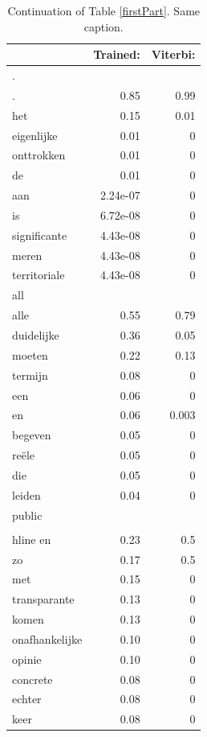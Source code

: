 \documentclass[11pt]{article}
\begin{document}
\begin{table}[h]
\begin{tabular}{l r r}
&Trained:	&Viterbi:\\\hline\hline
.&&\\\hline
.		&0.85		&0.99\\
het		&0.15		&0.01\\
eigenlijke	&0.01 	&0\\
onttrokken	&0.01		&0\\
de		&0.01		&0\\
aan		&2.24e-07	&0\\
is		&6.72e-08	&0\\
significante	&4.43e-08	&0\\
meren		&4.43e-08	&0\\
territoriale	&4.43e-08	&0\\\hline\hline
%
all&&\\\hline
alle		&0.55	&0.79\\
duidelijke	&0.36	&0.05\\
moeten	&0.22	&0.13\\
termijn	&0.08	&0\\
een		&0.06	&0\\
en		&0.06	&0.003\\
begeven	&0.05	&0\\
re\"ele	&0.05	&0\\
die		&0.05	&0\\
leiden		&0.04	&0\\\hline\hline
%
public	&&\\\\hline
en			&0.23		&0.5\\
zo			&0.17		&0.5\\
met			&0.15		&0\\
transparante		&0.13		&0\\
komen			&0.13		&0\\
onafhankelijke	&0.10		&0\\
opinie			&0.10		&0\\
concrete		&0.08		&0\\
echter			&0.08		&0\\
keer			&0.08		&0\\
%
\end{tabular}
\caption{Continuation of Table \ref{firstPart}. Same caption.}
\end{table}
\end{document}
